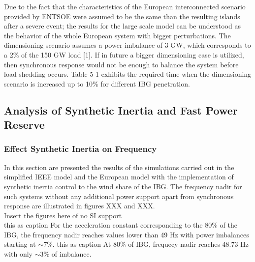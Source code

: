 
Due to the fact that the characteristics of the  European interconnected scenario provided by ENTSOE were assumed to be the same than the resulting islands after a severe event; the results for the large scale model can be understood as the behavior of the whole European system with bigger perturbations. The dimensioning scenario assumes a power imbalance of 3 GW, which corresponds to a 2\% of the 150 GW load [1]. If in future a bigger dimensioning case is utilized, then synchronous response would not be enough to balance the system before load shedding occurs. Table 5 1 exhibits the required time when the dimensioning scenario is increased up to 10\% for different IBG penetration.



\subsection{Analysis of Synthetic Inertia and Fast Power Reserve}

\subsubsection{Effect Synthetic Inertia on Frequency}

In this section are presented the results of the simulations carried out in the simplified IEEE model and the European model with the implementation of synthetic inertia control to the wind share of the IBG. The frequency nadir for such systems without any additional power support apart from synchronous response are illustrated in figures XXX and XXX. \\



Insert the figures here of no SI support\\

this as caption For the acceleration constant corresponding to the 80\% of the IBG, the frequency nadir reaches values lower than 49 Hz with power imbalances starting at $ \sim 7\% $.
this as caption At 80\% of IBG, frequecy nadir reaches 48.73 Hz with only $\sim 3\% $ of imbalance. \\


